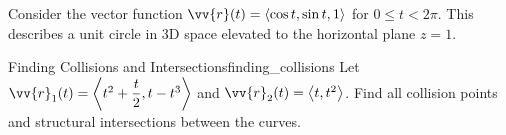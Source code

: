 \begin{example}
Consider the vector function $\vv{r}(t) = \ang{\cos t, \sin t, 1}$ for $0 \le t < 2\pi$. This describes a unit circle in 3D space elevated to the horizontal plane $z = 1$.

\begin{center}
\end{center}
\end{example}

\begin{problem}{Finding Collisions and Intersections}{finding_collisions}
Let $\vv{r}_1(t) = \ang{t^2 + \dfrac{t}{2}, t - t^3}$ and $\vv{r}_2(t) = \ang{t, t^2}$. Find all collision points and structural intersections between the curves.
\end{problem}

